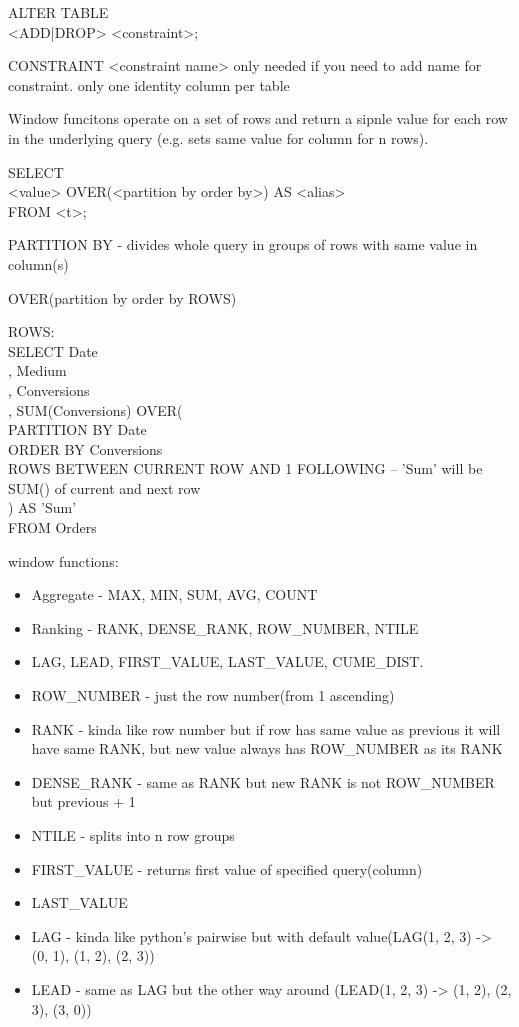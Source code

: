 \documentclass{article}
\begin{document}
    ALTER TABLE \\
    <ADD|DROP> <constraint>;

    CONSTRAINT <constraint name> only needed if you need to add name for constraint.
    only one identity column per table

    Window funcitons operate on a set of rows and return a sipnle value for each row in the underlying query
    (e.g. sets same value for column for n rows).

    SELECT \\
    <value> OVER(<partition by order by>) AS <alias> \\
    FROM <t>;

    PARTITION BY - divides whole query in groups of rows with same value in column(s)

    OVER(partition by order by ROWS)

    ROWS: \\
    SELECT Date \\
         , Medium​ \\
         , Conversions​ \\
         , SUM(Conversions) OVER( \\
            PARTITION BY Date \\
            ORDER BY Conversions \\
            ROWS BETWEEN CURRENT ROW AND 1 FOLLOWING -- 'Sum' will be SUM() of current and next row \\
         ) AS 'Sum' \\
    FROM Orders

    window functions:
    \begin{itemize}
        \item Aggregate - MAX, MIN, SUM, AVG, COUNT
        \item Ranking - RANK, DENSE_RANK, ROW_NUMBER, NTILE
        \item LAG, LEAD, FIRST_VALUE, LAST_VALUE, CUME_DIST.
    \end{itemize}
    \begin{itemize}
        \item ROW_NUMBER - just the row number(from 1 ascending)
        \item RANK - kinda like row number but if row has same value as previous it will have same RANK,
            but new value always has ROW_NUMBER as its RANK
        \item DENSE_RANK - same as RANK but new RANK is not ROW_NUMBER but previous + 1
        \item NTILE - splits into n row groups
        \item FIRST_VALUE - returns first value of specified query(column)
        \item LAST_VALUE
        \item LAG - kinda like python's pairwise but with default value(LAG(1, 2, 3) -> (0, 1), (1, 2), (2, 3))
        \item LEAD - same as LAG but the other way around (LEAD(1, 2, 3) -> (1, 2), (2, 3), (3, 0))
    \end{itemize}
\end{document}
